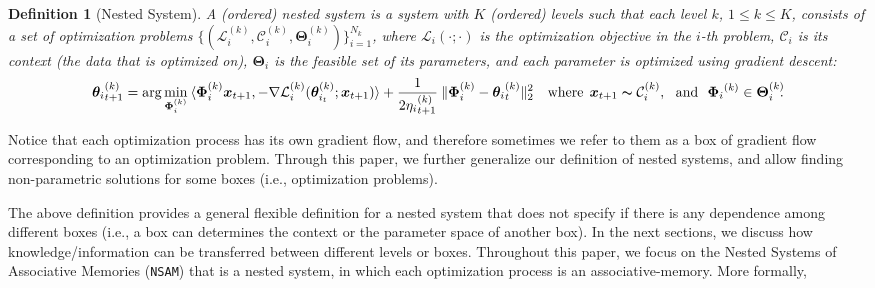 \documentclass{article}
\newtheorem{dfn}{Definition}
\newcommand{\inner}[2]{\langle #1, #2 \rangle}
\newcommand{\nsam}{\texttt{NSAM}}
\begin{document}
\begin{dfn}[Nested System]
    A (ordered) nested system is a system with $K$ (ordered) levels such that each level $k$, $1 \leq k \leq K$, consists of a set of optimization problems $\{ (\mathcal{L}^{(k)}_{i},  \mathcal{C}^{(k)}_i, \boldsymbol{\Theta}^{(k)}_{i}) \}_{i = 1}^{N_k}$, where $\mathcal{L}_{i}(\cdot; \cdot)$ is the optimization objective in the $i$-th problem, $\mathcal{C}_i$ is its context (the data that is optimized on), $\boldsymbol{\Theta}_{i}$ is the feasible set of its parameters, and each parameter is optimized using gradient descent:
    \begin{align}
        {\boldsymbol{\theta}_{i}}^{(k)}_{t+1} = \arg\min_{\boldsymbol{\Phi}^{(k)}_{i}} \: \inner{\boldsymbol{\Phi}^{(k)}_{i} \boldsymbol{x}_{t+1}}{- \nabla \mathcal{L}^{(k)}_i(\boldsymbol{\theta}^{(k)}_{i_t};\boldsymbol{x}_{t+1})} + \frac{1}{2{\eta_{i}}^{(k)}_{t+1}}\:\|\boldsymbol{\Phi}^{(k)}_{i} - {\boldsymbol{\theta}_{i}}^{(k)}_{t} \|^{2}_2 \quad \text{where}\:\:\boldsymbol{x}_{t+1} \thicksim \mathcal{C}^{(k)}_i, \:\:\: \text{and} \:\:\: {\boldsymbol{\Phi}_{i}}^{(k)} \in  \boldsymbol{\Theta}^{(k)}_{i}\!\!.
    \end{align}
\end{dfn} 

Notice that each  optimization process has its own gradient flow, and therefore sometimes  we refer to them as a box of gradient flow corresponding to an optimization problem. Through this paper, we further generalize our definition of nested systems, and allow finding non-parametric solutions for some boxes (i.e., optimization problems).   

The above definition provides a general flexible definition for a nested system that does not specify if there is any dependence among different boxes  (i.e., a box can determines the context or the parameter space of another box). In the next sections, we discuss how  knowledge/information can be transferred between different levels or boxes. Throughout this paper, we focus on the Nested Systems of Associative Memories (\nsam) that is a nested system, in which each optimization process is an associative-memory. More formally,
\end{document}

